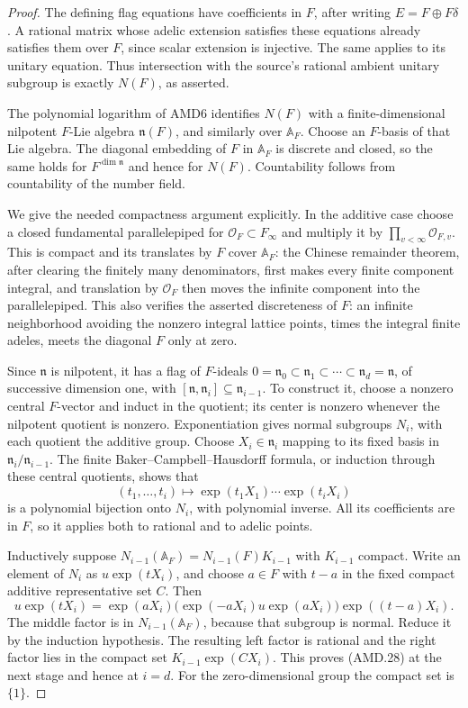 \documentclass[11pt,a4paper]{article}
\numberwithin{equation}{section}
\theoremstyle{remark}\newtheorem{remark}[theorem]{Remark}
\begin{document}
\begin{proof}
The defining flag equations have coefficients in \(F\), after
writing \(E=F\oplus F\delta\).  A rational matrix whose
adelic extension satisfies these equations already satisfies
them over \(F\), since scalar extension is injective.  The
same applies to its unitary equation.  Thus intersection with
the source's rational ambient unitary subgroup is exactly
\(N(F)\), as asserted.

The polynomial logarithm of AMD6 identifies \(N(F)\) with
a finite-dimensional nilpotent \(F\)-Lie algebra
\(\mathfrak n(F)\), and similarly over \(\mathbb A_F\).
Choose an \(F\)-basis of that Lie algebra.  The diagonal
embedding of \(F\) in \(\mathbb A_F\) is discrete and
closed, so the same holds for \(F^{\dim\mathfrak n}\) and
hence for \(N(F)\).  Countability follows from countability
of the number field.

We give the needed compactness argument explicitly.  In the
additive case choose a closed fundamental parallelepiped for
\(\mathcal O_F\subset F_\infty\) and multiply it by
\(\prod_{v<\infty}\mathcal O_{F,v}\).  This is compact and
its translates by \(F\) cover \(\mathbb A_F\): the Chinese
remainder theorem, after clearing the finitely many denominators,
first makes every finite component integral, and translation by
\(\mathcal O_F\) then moves the infinite component into the
parallelepiped.  This also verifies the asserted discreteness
of \(F\): an infinite neighborhood avoiding the nonzero
integral lattice points, times the integral finite adeles,
meets the diagonal \(F\) only at zero.

Since \(\mathfrak n\) is nilpotent, it has a flag of
\(F\)-ideals
\(0=\mathfrak n_0\subset\mathfrak n_1\subset\cdots
\subset\mathfrak n_d=\mathfrak n\), of successive dimension
one, with \([\mathfrak n,\mathfrak n_i]\subseteq\mathfrak n_{i-1}\).
To construct it, choose a nonzero central \(F\)-vector and
induct in the quotient; its center is nonzero whenever the
nilpotent quotient is nonzero.  Exponentiation gives normal
subgroups \(N_i\), with each quotient the additive group.
Choose \(X_i\in\mathfrak n_i\) mapping to its fixed basis
in \(\mathfrak n_i/\mathfrak n_{i-1}\).  The finite
Baker--Campbell--Hausdorff formula, or induction through these
central quotients, shows that
\[
 (t_1,\ldots,t_i)\longmapsto
             \exp(t_1X_1)\cdots\exp(t_iX_i)
 \tag{AMD.29}
\]
is a polynomial bijection onto \(N_i\), with polynomial
inverse.  All its coefficients are in \(F\), so it applies
both to rational and to adelic points.

Inductively suppose \(N_{i-1}(\mathbb A_F)=N_{i-1}(F)K_{i-1}\)
with \(K_{i-1}\) compact.  Write an element of \(N_i\) as
\(u\exp(tX_i)\), and choose \(a\in F\) with \(t-a\)
in the fixed compact additive representative set \(C\).
Then
\[
 u\exp(tX_i)=\exp(aX_i)
   \bigl(\exp(-aX_i)u\exp(aX_i)\bigr)\exp((t-a)X_i).
 \tag{AMD.30}
\]
The middle factor is in \(N_{i-1}(\mathbb A_F)\), because
that subgroup is normal.  Reduce it by the induction hypothesis.
The resulting left factor is rational and the right factor lies
in the compact set \(K_{i-1}\exp(CX_i)\).  This proves
(AMD.28) at the next stage and hence at \(i=d\).
For the zero-dimensional group the compact set is \(\{1\}\).
\end{proof}
\end{document}
